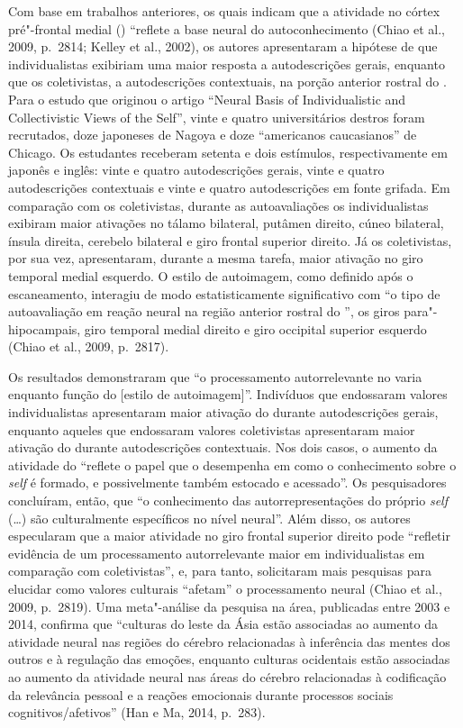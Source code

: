 Com base em trabalhos anteriores, os quais indicam que a atividade no
córtex pré"-frontal medial () ``reflete a base neural do
autoconhecimento (Chiao et al., 2009, p.~2814; Kelley et al., 2002), os
autores apresentaram a hipótese de que individualistas exibiriam uma
maior resposta a autodescrições gerais, enquanto que os coletivistas, a
autodescrições contextuais, na porção anterior rostral do . Para o
estudo que originou o artigo ``Neural Basis of Individualistic and
Collectivistic Views of the Self'', vinte e quatro universitários
destros foram recrutados, doze japoneses de Nagoya e doze ``americanos
caucasianos'' de Chicago. Os estudantes receberam setenta e dois
estímulos, respectivamente em japonês e inglês: vinte e quatro
autodescrições gerais, vinte e quatro autodescrições contextuais e vinte
e quatro autodescrições em fonte grifada. Em comparação com os
coletivistas, durante as autoavaliações os individualistas exibiram
maior ativações no tálamo bilateral, putâmen direito, cúneo bilateral,
ínsula direita, cerebelo bilateral e giro frontal superior direito. Já
os coletivistas, por sua vez, apresentaram, durante a mesma tarefa,
maior ativação no giro temporal medial esquerdo. O estilo de
autoimagem, como definido após o escaneamento, interagiu de modo
estatisticamente significativo com ``o tipo de autoavaliação em reação
neural na região anterior rostral do '', os giros para"-hipocampais,
giro temporal medial direito e giro occipital superior esquerdo (Chiao
et al., 2009, p.~2817).

Os resultados demonstraram que ``o processamento autorrelevante no 
varia enquanto função do {[}estilo de autoimagem{]}''. Indivíduos que
endossaram valores individualistas apresentaram maior ativação do 
durante autodescrições gerais, enquanto aqueles que endossaram valores
coletivistas apresentaram maior ativação do  durante autodescrições
contextuais. Nos dois casos, o aumento da atividade do  ``reflete o
papel que o  desempenha em como o conhecimento sobre o \emph{self} é
formado, e possivelmente também estocado e acessado''. Os pesquisadores
concluíram, então, que ``o conhecimento das autorrepresentações do
próprio \emph{self} (\ldots{}) são culturalmente específicos no nível neural''. Além
disso, os autores especularam que a maior atividade no giro frontal
superior direito pode ``refletir evidência de um processamento
autorrelevante maior em individualistas em comparação com
coletivistas'', e, para tanto, solicitaram mais pesquisas para elucidar
como valores culturais ``afetam'' o processamento neural (Chiao et al.,
2009, p.~2819). Uma meta"-análise da pesquisa na área, publicadas entre
2003 e 2014, confirma que ``culturas do leste da Ásia estão associadas
ao aumento da atividade neural nas regiões do cérebro relacionadas à
inferência das mentes dos outros e à regulação das emoções, enquanto
culturas ocidentais estão associadas ao aumento da atividade neural nas
áreas do cérebro relacionadas à codificação da relevância pessoal e a
reações emocionais durante processos sociais cognitivos/afetivos'' (Han
e Ma, 2014, p.~283).

